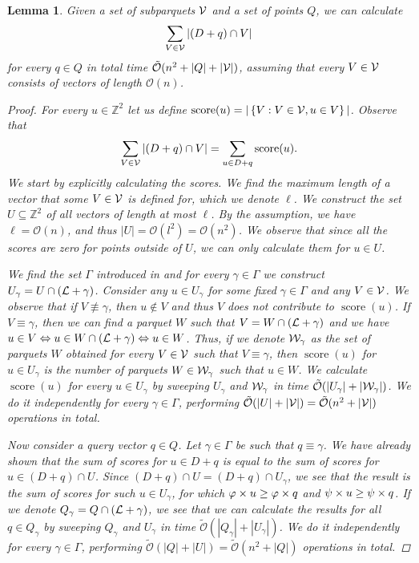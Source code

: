 \documentclass[11pt]{article}
\newcommand{\Z}{\mathbb{Z}}
\renewcommand{\O}{\mathcal{O}}
\newcommand{\tO}{\tilde{\mathcal{O}}}
\newcommand{\set}[1]{\left\lbrace #1 \right\rbrace}
\theoremstyle{plain}
\newtheorem{lemma}{Lemma}
\theoremstyle{definition}
\theoremstyle{remark}
\DeclareMathOperator*{\score}{score}
\begin{document}
\begin{lemma}\label{primitive_conv}
	Given a set of subparquets $\mathcal{V}$ and a set of points $Q$, we can calculate
	\[ \sum_{V \in \mathcal{V}} |(D + q) \cap V| \]
	for every $q \in Q$ in total time $\tO(n^2 + |Q| + |\V|)$, assuming that every $V \in \mathcal{V}$ consists of vectors of length $\O(n)$.
	\begin{proof}
		For every $u \in \Z^2$ let us define $\score(u) = |\set{V : V \in \V, u \in V}|$. Observe that
		\[ \sum_{V \in \V} |(D + q) \cap V| = \sum_{u \in D + q} \score(u). \]
		We start by explicitly calculating the scores.
		We find the maximum length of a vector that some $V \in \mathcal{V}$ is defined for, which we denote $\ell$.
		We construct the set $U \subseteq \Z^2$ of all vectors of length at most $\ell$.
		By the assumption, we have $\ell = \O(n)$, and thus $|U| = \O(l ^ 2) = \O(n ^ 2)$.
		We observe that since all the scores are zero for points outside of $U$, we can only calculate them for $u \in U$.
		
		We find the set $\Gamma$ introduced in  and for every $\gamma \in \Gamma$ we construct $U_\gamma = U \cap (\mathcal{L} + \gamma)$.
		Consider any $u \in U_\gamma$ for some fixed $\gamma \in \Gamma$ and any $V \in \mathcal{V}$.
		We observe that if $V \not \equiv \gamma$, then $u \not \in V$ and thus $V$ does not contribute to $\score(u)$.
		If $V \equiv \gamma$, then we can find a parquet $W$ such that $V = W \cap (\mathcal{L} + \gamma)$ and we have
		$u \in V \Leftrightarrow u \in W \cap (\mathcal{L} + \gamma) \Leftrightarrow u \in W$.
		Thus, if we denote $\mathcal{W}_\gamma$ as the set of parquets $W$ obtained for every $V \in \mathcal{V}$ such that $V \equiv \gamma$, then $\score(u)$ for $u \in U_\gamma$ is the number of parquets $W \in \mathcal{W}_\gamma$ such that $u \in W$.
		We calculate $\score(u)$ for every $u \in U_\gamma$ by sweeping $U_\gamma$ and $\mathcal{W}_\gamma$ in time $\tO(|U_\gamma| + |\W_\gamma|)$.
		We do it independently for every $\gamma \in \Gamma$, performing $\tO(|U| + |\V|) = \tO(n^2 + |\V|)$ operations in total.

		Now consider a query vector $q \in Q$.
		Let $\gamma \in \Gamma$ be such that $q \equiv \gamma$.
		We have already shown that the sum of scores for $u \in D + q$ is equal to the sum of scores for $u \in (D + q) \cap U$.
		Since $(D + q) \cap U = (D + q) \cap U_\gamma$, we see that the result is the sum of scores for such $u \in U_\gamma$, for which $\varphi \times u \ge \varphi \times q$ and $\psi \times u \ge \psi \times q$.
		If we denote $Q_\gamma = Q \cap (\mathcal{L} + \gamma)$, we see that we can calculate the results for all $q \in Q_\gamma$ by sweeping $Q_\gamma$ and $U_\gamma$ in time $\tO(|Q_\gamma| + |U_\gamma|)$.
		We do it independently for every $\gamma \in \Gamma$, performing $\tO(|Q| + |U|) = \tO(n^2 + |Q|)$ operations in total.
	\end{proof}
\end{lemma}
\end{document}
